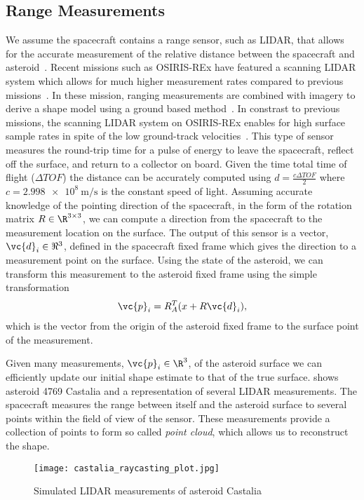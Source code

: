 \documentclass[smallextended]{svjour3}       %
\begin{document}
\subsection{Range Measurements}

We assume the spacecraft contains a range sensor, such as LIDAR, that allows for the accurate measurement of the relative distance between the spacecraft and asteroid~\cite{zuber1997,zuber2000}.
Recent missions such as OSIRIS-REx have featured a scanning LIDAR system which allows for much higher measurement rates compared to previous missions~\cite{lauretta2017,daly2017}.
In these mission, ranging measurements are combined with imagery to derive a shape model using a ground based method~\cite{gaskell2008}.
In constrast to previous missions, the scanning LIDAR system on OSIRIS-REx enables for high surface sample rates in spite of the low ground-track velocities~\cite{daly2017}.
This type of sensor measures the round-trip time for a pulse of energy to leave the spacecraft, reflect off the surface, and return to a collector on board.
Given the time total time of flight ($\Delta TOF$) the distance can be accurately computed using \( d = \frac{c \Delta TOF }{2} \) where \( c = \SI{2.998e8}{\meter\per\second}\) is the constant speed of light.
Assuming accurate knowledge of the pointing direction of the spacecraft, in the form of the rotation matrix \( R \in \R^{3 \times 3 } \), we can compute a direction from the spacecraft to the measurement location on the surface.
The output of this sensor is a vector, \( \vc{d}_i\in\Re^3 \), defined in the spacecraft fixed frame which gives the direction to a measurement point on the surface. 
Using the state of the asteroid, we can transform this measurement to the asteroid fixed frame using the simple transformation
\begin{align*}
    \vc{p}_i = R_A^T (x+R \vc{d}_i), 
\end{align*}
which is the vector from the origin of the asteroid fixed frame to the surface point of the measurement.

Given many measurements, \( \vc{p}_i \in \R^3 \), of the asteroid surface we can efficiently update our initial shape estimate to that of the true surface.
 shows asteroid 4769 Castalia and a representation of several LIDAR measurements. 
The spacecraft measures the range between itself and the asteroid surface to several points within the field of view of the sensor. 
These measurements provide a collection of points to form so called \textit{point cloud}, which allows us to reconstruct the shape.
\begin{figure}
    \centering
    \texttt{[image: castalia\_raycasting\_plot.jpg]}
    \caption{Simulated LIDAR measurements of asteroid Castalia~\label{fig:lidar_example}}
\end{figure}
\end{document}
